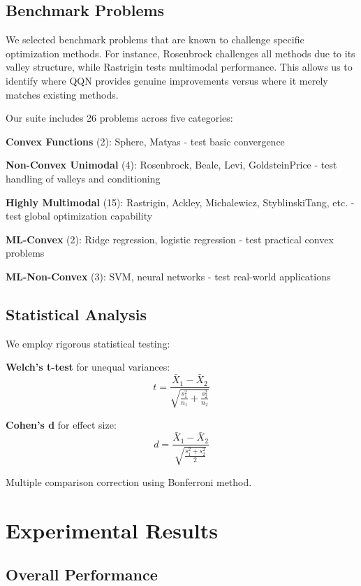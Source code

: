 \hypertarget{benchmark-problems}{%
\subsection{Benchmark Problems}\label{benchmark-problems}}

We selected benchmark problems that are known to challenge specific optimization methods. For instance, Rosenbrock challenges all methods due to its valley structure, while Rastrigin tests multimodal performance. This allows us to identify where QQN provides genuine improvements versus where it merely matches existing methods.

Our suite includes 26 problems across five categories:

\textbf{Convex Functions} (2): Sphere, Matyas - test basic convergence

\textbf{Non-Convex Unimodal} (4): Rosenbrock, Beale, Levi, GoldsteinPrice - test handling of valleys and conditioning

\textbf{Highly Multimodal} (15): Rastrigin, Ackley, Michalewicz, StyblinskiTang, etc. - test global optimization capability

\textbf{ML-Convex} (2): Ridge regression, logistic regression - test practical convex problems

\textbf{ML-Non-Convex} (3): SVM, neural networks - test real-world applications

\hypertarget{statistical-analysis}{%
\subsection{Statistical Analysis}\label{statistical-analysis}}

We employ rigorous statistical testing:

\textbf{Welch's t-test} for unequal variances:
\[t = \frac{\bar{X}_1 - \bar{X}_2}{\sqrt{\frac{s_1^2}{n_1} + \frac{s_2^2}{n_2}}}\]

\textbf{Cohen's d} for effect size:
\[d = \frac{\bar{X}_1 - \bar{X}_2}{\sqrt{\frac{s_1^2 + s_2^2}{2}}}\]

Multiple comparison correction using Bonferroni method.

\hypertarget{experimental-results}{%
\section{Experimental Results}\label{experimental-results}}

\hypertarget{overall-performance}{%
\subsection{Overall Performance}\label{overall-performance}}


